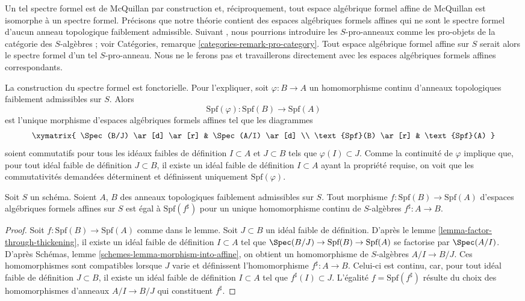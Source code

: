 \noindent
Un tel spectre formel est de McQuillan par construction et, réciproquement,
tout espace algébrique formel affine de McQuillan est isomorphe à un
spectre formel. Précisons que notre théorie contient des espaces algébriques
formels affines qui ne sont le spectre formel d'aucun
anneau topologique faiblement admissible.
Suivant \cite{Yasuda}, nous pourrions introduire les $S$-pro-anneaux
comme les pro-objets de la catégorie des $S$-algèbres ; voir Catégories,
remarque \ref{categories-remark-pro-category}. Tout
espace algébrique formel affine sur $S$ serait alors le spectre formel d'un tel
$S$-pro-anneau. Nous ne le ferons pas et travaillerons directement avec les
espaces algébriques formels affines correspondants.

\medskip\noindent
La construction du spectre formel est fonctorielle. Pour l'expliquer,
soit $\varphi : B \to A$ un homomorphisme continu d'anneaux topologiques
faiblement admissibles sur $S$. Alors
$$
\text{Spf}(\varphi) : \text{Spf}(B) \to \text{Spf}(A)
$$
est l'unique morphisme d'espaces algébriques formels affines tel que
les diagrammes
$$
\xymatrix{
\Spec(B/J) \ar[d] \ar[r] & \Spec(A/I) \ar[d] \\
\text{Spf}(B) \ar[r] & \text{Spf}(A)
}
$$
soient commutatifs pour tous les idéaux faibles de définition $I \subset A$ et $J \subset B$
tels que $\varphi(I) \subset J$. Comme la continuité de $\varphi$
implique que, pour tout idéal faible de définition $J \subset B$,
il existe un idéal faible de définition $I \subset A$ ayant la propriété
requise, on voit que les commutativités demandées déterminent
et définissent uniquement $\text{Spf}(\varphi)$.

\begin{lemma}
\label{lemma-morphism-between-formal-spectra}
Soit $S$ un schéma. Soient $A$, $B$ des anneaux topologiques faiblement admissibles
sur $S$. Tout morphisme $f : \text{Spf}(B) \to \text{Spf}(A)$
d'espaces algébriques formels affines sur $S$
est égal à $\text{Spf}(f^\sharp)$ pour un unique homomorphisme continu
de $S$-algèbres $f^\sharp : A \to B$.
\end{lemma}

\begin{proof}
Soit $f : \text{Spf}(B) \to \text{Spf}(A)$ comme dans le lemme.
Soit $J \subset B$ un idéal faible de définition. D'après
le lemme \ref{lemma-factor-through-thickening},
il existe un idéal faible de définition $I \subset A$ tel que
$\Spec(B/J) \to \text{Spf}(B) \to \text{Spf}(A)$
se factorise par $\Spec(A/I)$. D'après
Schémas, lemme \ref{schemes-lemma-morphism-into-affine},
on obtient un homomorphisme de $S$-algèbres $A/I \to B/J$.
Ces homomorphismes sont compatibles lorsque $J$ varie et définissent
l'homomorphisme $f^\sharp : A \to B$. Celui-ci est continu, car,
pour tout idéal faible de définition $J \subset B$, il existe un
idéal faible de définition $I \subset A$ tel que
$f^\sharp(I) \subset J$. L'égalité $f = \text{Spf}(f^\sharp)$
résulte du choix des homomorphismes d'anneaux $A/I \to B/J$ qui constituent $f^\sharp$.
\end{proof}

